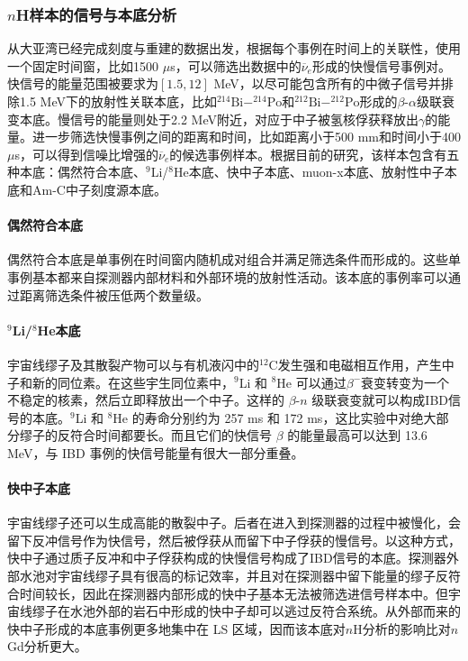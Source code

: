 \documentclass[a4paper,zihao=-4]{article}
\begin{document}
\subsubsection{$n$H样本的信号与本底分析}\label{sec:backgrounds}
从大亚湾已经完成刻度与重建的数据出发，根据每个事例在时间上的关联性，使用一个固定时间窗，比如1500 $\mu$s，可以筛选出数据中的$\overline{\nu}_e$形成的快慢信号事例对。快信号的能量范围被要求为$[1.5, 12]$ MeV，以尽可能包含所有的中微子信号并排除1.5 MeV下的放射性关联本底，比如$^{214}\text{Bi}-^{214}\text{Po}$和$^{212}\text{Bi}-^{212}\text{Po}$形成的$\beta$-$\alpha$级联衰变本底。慢信号的能量则处于2.2 MeV附近，对应于中子被氢核俘获释放出$\gamma$的能量。进一步筛选快慢事例之间的距离和时间，比如距离小于500 mm和时间小于400 $\mu$s，可以得到信噪比增强的$\overline{\nu}_e$的候选事例样本。根据目前的研究，该样本包含有五种本底：偶然符合本底、$^9$Li/$^8$He本底、快中子本底、muon-x本底、放射性中子本底和Am-C中子刻度源本底。

\paragraph{偶然符合本底}

偶然符合本底是单事例在时间窗内随机成对组合并满足筛选条件而形成的。这些单事例基本都来自探测器内部材料和外部环境的放射性活动。该本底的事例率可以通过距离筛选条件被压低两个数量级。

\paragraph{$^9$Li/$^8$He本底}宇宙线缪子及其散裂产物可以与有机液闪中的$^{12}$C发生强和电磁相互作用，产生中子和新的同位素。在这些宇生同位素中，$^9$Li 和 $^8$He 可以通过$\beta^-$衰变转变为一个不稳定的核素，然后立即释放出一个中子。这样的 $\beta$-$n$ 级联衰变就可以构成IBD信号的本底。$^9$Li 和 $^8$He 的寿命分别约为 257 ms 和 172 ms，这比实验中对绝大部分缪子的反符合时间都要长。而且它们的快信号 $\beta$ 的能量最高可以达到 13.6 MeV，与 IBD 事例的快信号能量有很大一部分重叠。
\paragraph{快中子本底}宇宙线缪子还可以生成高能的散裂中子。后者在进入到探测器的过程中被慢化，会留下反冲信号作为快信号，然后被俘获从而留下中子俘获的慢信号。以这种方式，快中子通过质子反冲和中子俘获构成的快慢信号构成了IBD信号的本底。探测器外部水池对宇宙线缪子具有很高的标记效率，并且对在探测器中留下能量的缪子反符合时间较长，因此在探测器内部形成的快中子基本无法被筛选进信号样本中。但宇宙线缪子在水池外部的岩石中形成的快中子却可以逃过反符合系统。从外部而来的快中子形成的本底事例更多地集中在 LS 区域，因而该本底对$n$H分析的影响比对$n$Gd分析更大。
\end{document}
